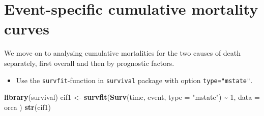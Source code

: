 \documentclass[
]{book}
\newenvironment{Shaded}{\begin{snugshade}}{\end{snugshade}}
\newcommand{\AttributeTok}[1]{\textcolor[rgb]{0.13,0.29,0.53}{#1}}
\newcommand{\DecValTok}[1]{\textcolor[rgb]{0.00,0.00,0.81}{#1}}
\newcommand{\FunctionTok}[1]{\textcolor[rgb]{0.13,0.29,0.53}{\textbf{#1}}}
\newcommand{\NormalTok}[1]{#1}
\newcommand{\OtherTok}[1]{\textcolor[rgb]{0.56,0.35,0.01}{#1}}
\newcommand{\SpecialCharTok}[1]{\textcolor[rgb]{0.81,0.36,0.00}{\textbf{#1}}}
\newcommand{\StringTok}[1]{\textcolor[rgb]{0.31,0.60,0.02}{#1}}
\providecommand{\tightlist}{%
  \setlength{\itemsep}{0pt}\setlength{\parskip}{0pt}}
\begin{document}
\section{Event-specific cumulative mortality curves}\label{event-specific-cumulative-mortality-curves}

We move on to analysing cumulative mortalities for the
two causes of death separately, first overall and then
by prognostic factors.

\begin{itemize}
\tightlist
\item
  Use the \texttt{survfit}-function in \texttt{survival} package with option \texttt{type="mstate"}.
\end{itemize}

\begin{Shaded}
\begin{Highlighting}[]
\FunctionTok{library}\NormalTok{(survival)}
\NormalTok{cif1 }\OtherTok{\textless{}{-}} \FunctionTok{survfit}\NormalTok{(}\FunctionTok{Surv}\NormalTok{(time, event, }\AttributeTok{type =} \StringTok{"mstate"}\NormalTok{) }\SpecialCharTok{\textasciitilde{}} \DecValTok{1}\NormalTok{,}
  \AttributeTok{data =}\NormalTok{ orca}
\NormalTok{)}
\FunctionTok{str}\NormalTok{(cif1)}
\end{Highlighting}
\end{Shaded}
\end{document}
